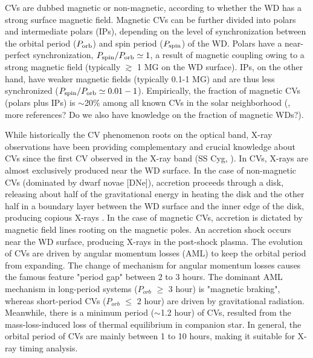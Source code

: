 \documentclass[fleqn,usenatbib]{mnras}
\begin{document}
CVs are dubbed magnetic or non-magnetic, according to whether the WD has a strong surface magnetic field. Magnetic CVs can be further divided into polars and intermediate polars (IPs), depending on the level of synchronization between the orbital period ($P_{\rm orb}$) and spin period ($P_{\rm spin}$) of the WD. Polars have a near-perfect synchronization, $P_{\rm spin}/P_{\rm orb}\simeq 1$, a result of magnetic coupling owing to a strong magnetic field (typically $\gtrsim$ 1 MG on the WD surface).
IPs, on the other hand, have weaker magnetic fields (typically 0.1-1 MG) and are thus less synchronized ($P_{\rm spin}/P_{\rm orb}\simeq 0.01-1$).
Empirically, the fraction of  magnetic CVs (polars plus IPs) is $\sim$20\% among all known CVs in the solar neighborhood (\citealt{2003A&A...404..301R}, more references? Do we also have knowledge on the fraction of magnetic WDs?).      

While historically the CV phenomenon roots on the optical band, X-ray observations have been providing complementary and crucial knowledge about CVs since the first CV observed in the X-ray band (SS Cyg, \citealp{1974ApJ...187L...5R,1978ApJ...224..953S}). 
In CVs, X-rays are almost exclusively produced near the WD surface. 
In the case of non-magnetic CVs (dominated by dwarf novae [DNe]), accretion proceeds through a disk, releasing about half of the gravitational energy in heating the disk and the other half in a boundary layer between the WD surface and the inner edge of the disk, producing copious X-rays \citep{2001cvs..book.....H}.    
In the case of magnetic CVs, accretion is dictated by magnetic field lines rooting on the magnetic poles. An accretion shock occurs near the WD surface, producing X-rays in the post-shock plasma. 
The evolution of CVs are driven by angular momentum losses (AML) to keep the orbital period from expanding. The change of mechanism for angular momentum losses causes the famous feature "period gap" between 2 to 3 hours.  The dominant AML mechanism in long-period systems ($P_{orb}$ $\geq$ 3 hour) is "magnetic braking", whereas short-period CVs ($P_{orb}$ $\leq$ 2 hour) are  driven by gravitational radiation. Meanwhile, there is a minimum period ($\sim$1.2 hour) of CVs, resulted from the mass-loss-induced loss of thermal equilibrium in companion star. 
In general, the orbital period of CVs are mainly between 1 to 10 hours, making it suitable for X-ray timing analysis.
\end{document}
